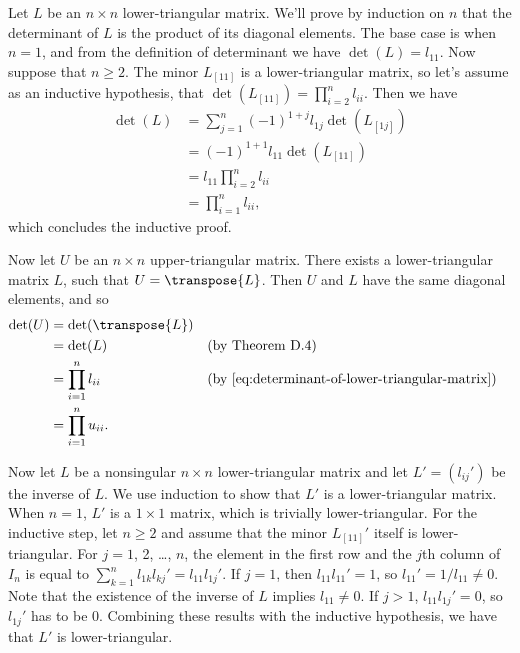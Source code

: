 Let $L$ be an $n\times n$ lower-triangular matrix.
We'll prove by induction on $n$ that the determinant of $L$ is the product of its diagonal elements.
The base case is when $n=1$, and from the definition of determinant we have $\det(L)=l_{11}$.
Now suppose that $n\ge2$.
The minor $L_{[11]}$ is a lower-triangular matrix, so let's assume as an inductive hypothesis, that $\det(L_{[11]})=\prod_{i=2}^nl_{ii}$.
Then we have
\begin{align} \label{eq:determinant-of-lower-triangular-matrix}
    \det(L) &= \sum_{j=1}^n(-1)^{1+j}l_{1j}\det(L_{[1j]}) \nonumber \\
    &= (-1)^{1+1}l_{11}\det(L_{[11]}) \nonumber \\
    &= l_{11}\prod_{i=2}^nl_{ii} \nonumber \\
    &= \prod_{i=1}^nl_{ii},
\end{align}
which concludes the inductive proof.

Now let $U$ be an $n\times n$ upper-triangular matrix.
There exists a lower-triangular matrix $L$, such that $U=\transpose{L}$.
Then $U$ and $L$ have the same diagonal elements, and so
\begin{align*}
    \det(U) &= \det(\transpose{L}) \\
    &= \det(L) && \text{(by Theorem D.4)} \\
    &= \prod_{i=1}^nl_{ii} && \text{(by \eqref{eq:determinant-of-lower-triangular-matrix})} \\
    &= \prod_{i=1}^nu_{ii}.
\end{align*}

Now let $L$ be a nonsingular $n\times n$ lower-triangular matrix and let $L'=(l_{ij}')$ be the inverse of $L$.
We use induction to show that $L'$ is a lower-triangular matrix.
When $n=1$, $L'$ is a $1\times1$ matrix, which is trivially lower-triangular.
For the inductive step, let $n\ge2$ and assume that the minor $L_{[11]}'$ itself is lower-triangular.
For $j=1$, 2, \dots, $n$, the element in the first row and the $j$th column of $I_n$ is equal to $\sum_{k=1}^nl_{1k}l_{kj}'=l_{11}l_{1j}'$.
If $j=1$, then $l_{11}l_{11}'=1$, so $l_{11}'=1/l_{11}\ne0$.
Note that the existence of the inverse of $L$ implies $l_{11}\ne0$.
If $j>1$, $l_{11}l_{1j}'=0$, so $l_{1j}'$ has to be 0.
Combining these results with the inductive hypothesis, we have that $L'$ is lower-triangular.
